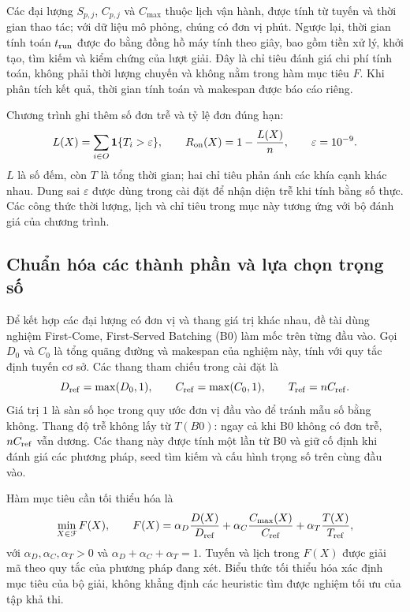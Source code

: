 Các đại lượng $S_{p,j}$, $C_{p,j}$ và $C_{\max}$ thuộc lịch vận hành, được tính từ tuyến và thời gian thao tác; với dữ liệu mô phỏng, chúng có đơn vị phút. Ngược lại, thời gian tính toán $t_{\rm run}$ được đo bằng đồng hồ máy tính theo giây, bao gồm tiền xử lý, khởi tạo, tìm kiếm và kiểm chứng của lượt giải. Đây là chỉ tiêu đánh giá chi phí tính toán, không phải thời lượng chuyến và không nằm trong hàm mục tiêu $F$. Khi phân tích kết quả, thời gian tính toán và makespan được báo cáo riêng.

Chương trình ghi thêm số đơn trễ và tỷ lệ đơn đúng hạn:
\begin{equation}
 L(X)=\sum_{i\in O}\mathbf1\{T_i>\varepsilon\},\qquad
 R_{\rm on}(X)=1-\frac{L(X)}{n},\qquad \varepsilon=10^{-9}.\label{eq:model-service-metrics}
\end{equation}
$L$ là số đếm, còn $T$ là tổng thời gian; hai chỉ tiêu phản ánh các khía cạnh khác nhau. Dung sai $\varepsilon$ được dùng trong cài đặt để nhận diện trễ khi tính bằng số thực. Các công thức thời lượng, lịch và chỉ tiêu trong mục này tương ứng với bộ đánh giá của chương trình.

\subsection{Chuẩn hóa các thành phần và lựa chọn trọng số}

Để kết hợp các đại lượng có đơn vị và thang giá trị khác nhau, đề tài dùng nghiệm First-Come, First-Served Batching (B0) làm mốc trên từng đầu vào. Gọi $D_0$ và $C_0$ là tổng quãng đường và makespan của nghiệm này, tính với quy tắc định tuyến cơ sở. Các thang tham chiếu trong cài đặt là
\begin{equation}
 D_{\rm ref}=\max(D_0,1),\qquad
 C_{\rm ref}=\max(C_0,1),\qquad
 T_{\rm ref}=nC_{\rm ref}.\label{eq:model-normalization}
\end{equation}
Giá trị $1$ là sàn số học trong quy ước đơn vị đầu vào để tránh mẫu số bằng không. Thang độ trễ không lấy từ $T(B0)$: ngay cả khi B0 không có đơn trễ, $nC_{\rm ref}$ vẫn dương. Các thang này được tính một lần từ B0 và giữ cố định khi đánh giá các phương pháp, seed tìm kiếm và cấu hình trọng số trên cùng đầu vào.

Hàm mục tiêu cần tối thiểu hóa là
\begin{equation}
 \min_{X\in\mathcal F}F(X),\qquad
 F(X)=\alpha_D\frac{D(X)}{D_{\rm ref}}
 +\alpha_C\frac{C_{\max}(X)}{C_{\rm ref}}
 +\alpha_T\frac{T(X)}{T_{\rm ref}},\label{eq:model-objective}
\end{equation}
với $\alpha_D,\alpha_C,\alpha_T>0$ và $\alpha_D+\alpha_C+\alpha_T=1$. Tuyến và lịch trong $F(X)$ được giải mã theo quy tắc của phương pháp đang xét. Biểu thức tối thiểu hóa xác định mục tiêu của bộ giải, không khẳng định các heuristic tìm được nghiệm tối ưu của tập khả thi.

